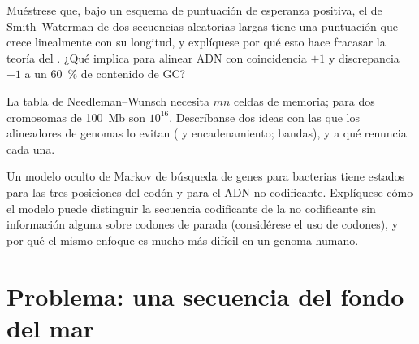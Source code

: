 \begin{exercise}[$\star\star\star$]\label{exo:b3:bioinformatics:10}
Muéstrese que, bajo un esquema de puntuación de esperanza positiva, el
 de Smith--Waterman de dos secuencias aleatorias largas
tiene una puntuación que crece linealmente con su longitud, y explíquese
por qué esto hace fracasar la teoría del . ¿Qué implica para
alinear ADN con coincidencia $+1$ y discrepancia $-1$ a un \qty{60}{\%}
de contenido de GC?
\end{exercise}

\begin{exercise}[$\star\star\star$]\label{exo:b3:bioinformatics:11}
La tabla de Needleman--Wunsch necesita $mn$ celdas de memoria; para dos
cromosomas de \qty{100}{Mb} son $10^{16}$. Descríbanse dos ideas con las
que los alineadores de genomas lo evitan ( y encadenamiento;
bandas), y a qué renuncia cada una.
\end{exercise}

\begin{exercise}[$\star\star\star$]\label{exo:b3:bioinformatics:12}
Un modelo oculto de Markov de búsqueda de genes para bacterias tiene
estados para las tres posiciones del codón y para el ADN no codificante.
Explíquese cómo el modelo puede distinguir la secuencia codificante de la
no codificante sin información alguna sobre codones de parada
(considérese el uso de codones), y por qué el mismo enfoque es mucho más
difícil en un genoma humano.
\end{exercise}

\section{Problema: una secuencia del fondo del mar}

